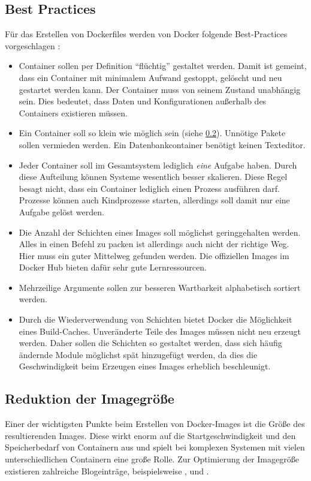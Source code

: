 \subsection{Best Practices}
\label{sec:dockerfile-best-practices}
Für das Erstellen von Dockerfiles werden von Docker folgende Best-Practices vorgeschlagen \autocite{docker-dockerfile-best-practices:online}:
\begin{itemize}
    \item Container sollen per Definition "`flüchtig"' gestaltet werden. Damit ist gemeint, dass ein Container mit minimalem Aufwand gestoppt, gelöscht und neu gestartet werden kann. Der Container muss von seinem Zustand unabhängig sein. Dies bedeutet, dass Daten und Konfigurationen außerhalb des Containers existieren müssen.
    \item Ein Container soll so klein wie möglich sein (siehe \cref{sec:minimize-imagesize}). Unnötige Pakete sollen vermieden werden. Ein Datenbankcontainer benötigt keinen Texteditor.
    \item Jeder Container soll im Gesamtsystem lediglich \emph{eine} Aufgabe haben. Durch diese Aufteilung können Systeme wesentlich besser skalieren. Diese Regel besagt nicht, dass ein Container lediglich einen Prozess ausführen darf. Prozesse können auch Kindprozesse starten, allerdings soll damit nur eine Aufgabe gelöst werden.
    \item Die Anzahl der Schichten eines Images soll möglichst geringgehalten werden. Alles in einen Befehl zu packen ist allerdings auch nicht der richtige Weg. Hier muss ein guter Mittelweg gefunden werden. Die offiziellen Images im Docker Hub bieten dafür sehr gute Lernressourcen.
    \item Mehrzeilige Argumente sollen zur besseren Wartbarkeit alphabetisch sortiert werden.
    \item Durch die Wiederverwendung von Schichten bietet Docker die Möglichkeit eines Build-Caches. Unveränderte Teile des Images müssen nicht neu erzeugt werden. Daher sollen die Schichten so gestaltet werden, dass sich häufig ändernde Module möglichst spät hinzugefügt werden, da dies die Geschwindigkeit beim Erzeugen eines Images erheblich beschleunigt.
\end{itemize}

\subsection{Reduktion der Imagegröße}
\label{sec:minimize-imagesize}
Einer der wichtigsten Punkte beim Erstellen von Docker-Images ist die Größe des resultierenden Images.
Diese wirkt enorm auf die Startgeschwindigkeit und den Speicherbedarf von Containern aus und spielt bei komplexen Systemen mit vielen unterschiedlichen Containern eine große Rolle.
Zur Optimierung der Imagegröße existieren zahlreiche Blogeinträge, beispielsweise \autocite{smallest-docker-container:online}, \autocite{alpine-real-world:online} und \autocite{docker-imagesize-refactoring:online}.
